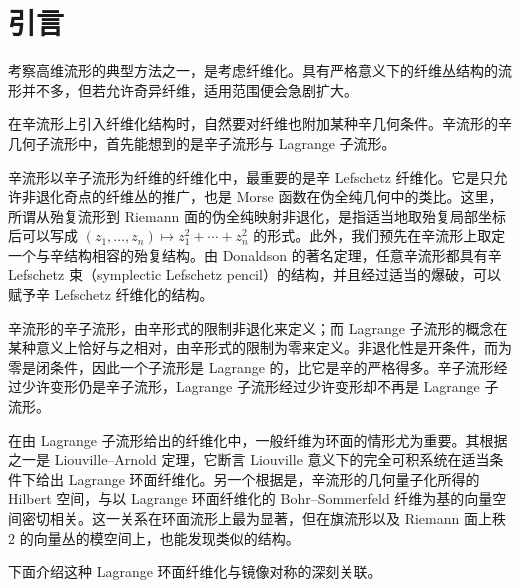 \section{引言}

考察高维流形的典型方法之一，是考虑纤维化。具有严格意义下的纤维丛结构的流形并不多，但若允许奇异纤维，适用范围便会急剧扩大。

在辛流形上引入纤维化结构时，自然要对纤维也附加某种辛几何条件。辛流形的辛几何子流形中，首先能想到的是辛子流形与 Lagrange 子流形。

辛流形以辛子流形为纤维的纤维化中，最重要的是辛 Lefschetz 纤维化。它是只允许非退化奇点的纤维丛的推广，也是 Morse 函数在伪全纯几何中的类比。这里，所谓从殆复流形到 Riemann 面的伪全纯映射非退化，是指适当地取殆复局部坐标后可以写成 $(z_1,\dots,z_n)\mapsto z_1^2+\cdots+z_n^2$ 的形式。此外，我们预先在辛流形上取定一个与辛结构相容的殆复结构。由 Donaldson 的著名定理，任意辛流形都具有辛 Lefschetz 束（symplectic Lefschetz pencil）的结构，并且经过适当的爆破，可以赋予辛 Lefschetz 纤维化的结构。

辛流形的辛子流形，由辛形式的限制非退化来定义；而 Lagrange 子流形的概念在某种意义上恰好与之相对，由辛形式的限制为零来定义。非退化性是开条件，而为零是闭条件，因此一个子流形是 Lagrange 的，比它是辛的严格得多。辛子流形经过少许变形仍是辛子流形，Lagrange 子流形经过少许变形却不再是 Lagrange 子流形。

在由 Lagrange 子流形给出的纤维化中，一般纤维为环面的情形尤为重要。其根据之一是 Liouville–Arnold 定理，它断言 Liouville 意义下的完全可积系统在适当条件下给出 Lagrange 环面纤维化。另一个根据是，辛流形的几何量子化所得的 Hilbert 空间，与以 Lagrange 环面纤维化的 Bohr--Sommerfeld 纤维为基的向量空间密切相关。这一关系在环面流形上最为显著，但在旗流形以及 Riemann 面上秩 $2$ 的向量丛的模空间上，也能发现类似的结构。

下面介绍这种 Lagrange 环面纤维化与镜像对称的深刻关联。

